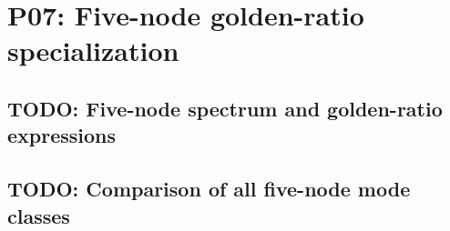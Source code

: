 
\section{P07: Five-node golden-ratio specialization}
\label{sec:P07}

\subsection{TODO: Five-node spectrum and golden-ratio expressions}
\label{slot:P07-1}

\subsection{TODO: Comparison of all five-node mode classes}
\label{slot:P07-2}
